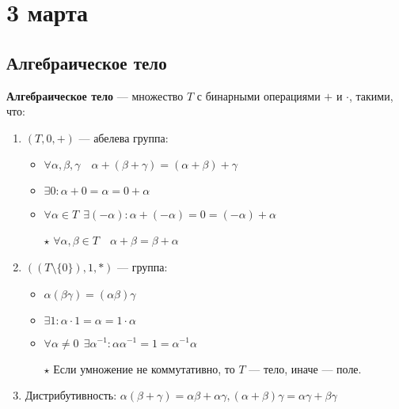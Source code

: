 \chapter{3 марта}

\section{Алгебраическое тело}

\begin{definition}
    \textbf{Алгебраическое тело} --- множество \(T\) с бинарными операциями \(+\) и \(\cdot\), такими, что:
    \begin{enumerate}
        \item \((T, 0, +)\) --- абелева группа:
              \begin{itemize}
                  \item \(\forall \alpha, \beta, \gamma \quad \alpha + (\beta + \gamma) = (\alpha + \beta) + \gamma\)
                  \item \(\exists 0 : \alpha + 0 = \alpha = 0 + \alpha\)
                  \item \(\forall \alpha \in T \ \ \exists ( - \alpha) : \alpha + ( - \alpha) = 0 = ( - \alpha) + \alpha\)
                  \item[\(\star\)] \(\forall \alpha, \beta \in T \quad \alpha + \beta = \beta + \alpha\)
              \end{itemize}
        \item \(((T \setminus \{0\}), 1, *)\) --- группа:
              \begin{itemize}
                  \item \(\alpha (\beta \gamma) = (\alpha \beta) \gamma\)
                  \item \(\exists 1 : \alpha \cdot 1 = \alpha = 1 \cdot \alpha\)
                  \item \(\forall \alpha \neq 0 \ \ \exists \alpha^{-1} : \alpha\alpha^{-1} = 1 = \alpha^{-1}\alpha\)
                  \item[\(\star\)] Если умножение не коммутативно, то \(T\) --- тело, иначе --- поле.
              \end{itemize}
        \item Дистрибутивность: \(\alpha(\beta + \gamma) = \alpha\beta + \alpha\gamma, (\alpha + \beta)\gamma = \alpha \gamma + \beta\gamma\)
    \end{enumerate}
\end{definition}


